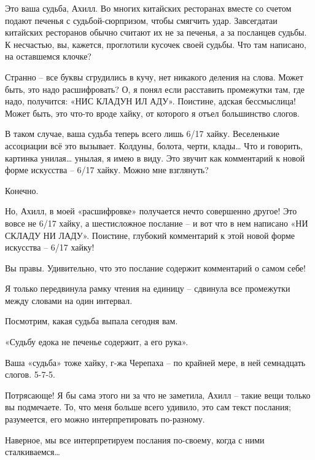 \documentclass[../main.tex]{subfiles}
\begin{document}
\begin{dialogue}
 Это ваша судьба, Ахилл. Во многих китайских ресторанах вместе со счетом подают печенья с судьбой-сюрпризом, чтобы смягчить удар. Завсегдатаи китайских ресторанов обычно считают их не за печенья, а за посланцев судьбы. К несчастью, вы, кажется, проглотили кусочек своей судьбы. Что там написано, на оставшемся клочке?

 Странно \--- все буквы сгрудились в кучу, нет никакого деления на слова. Может быть, это надо расшифровать? О, я понял если расставить промежутки там, где надо, получится: «НИС КЛАДУН ИЛ АДУ». Поистине, адская бессмыслица! Может быть, это что-то вроде хайку, от которого я отъел большинство слогов.

 В таком случае, ваша судьба теперь всего лишь 6/17 хайку. Веселенькие ассоциации всё это вызывает. Колдуны, болота, черти, клады\ldots{} Что и говорить, картинка унилая\ldots{} унылая, я имею в виду. Это звучит как комментарий к новой форме искусства \--- 6/17 хайку. Можно мне взглянуть?

 Конечно.

 Но, Ахилл, в моей «расшифровке» получается нечто совершенно другое! Это вовсе не 6/17 хайку, а шестисложное послание \--- и вот что в нем написано «НИ СКЛАДУ НИ ЛАДУ». Поистине, глубокий комментарий к этой новой форме искусства \--- 6/17 хайку!

 Вы правы. Удивительно, что это послание содержит комментарий о самом себе!

 Я только передвинула рамку чтения на единицу \--- сдвинула все промежутки между словами на один интервал.

 Посмотрим, какая судьба выпала сегодня вам.

 «Судьбу едока не печенье содержит, а его рука».

 Ваша «судьба» тоже хайку, г-жа Черепаха \--- по крайней мере, в ней семнадцать слогов. \mbox{5-7-5}.

 Потрясающе! Я бы сама этого ни за что не заметила, Ахилл \--- такие вещи только вы подмечаете. То, что меня больше всего удивило, это сам текст послания; разумеется, его можно интерпретировать по-разному.

 Наверное, мы все интерпретируем послания по-своему, когда с ними сталкиваемся\ldots{}



\end{dialogue}
\end{document}
